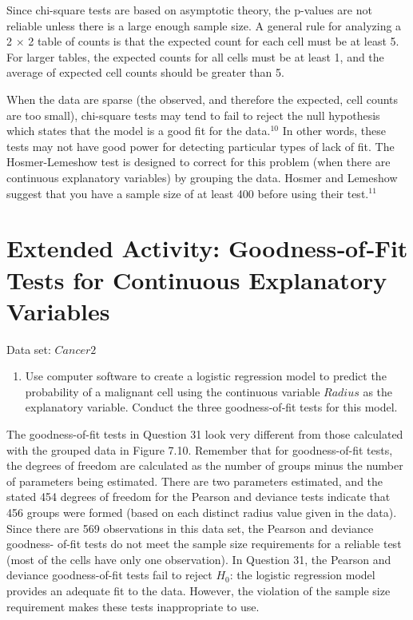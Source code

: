 \documentclass[
]{report}
\providecommand{\tightlist}{%
  \setlength{\itemsep}{0pt}\setlength{\parskip}{0pt}}
\begin{document}
Since chi-square tests are based on asymptotic theory, the p-values are not reliable unless there is a large
enough sample size. A general rule for analyzing a 2 \(\times\) 2 table of counts is that the expected count for each
cell must be at least 5. For larger tables, the expected counts for all cells must be at least 1, and the average
of expected cell counts should be greater than 5.

When the data are sparse (the observed, and therefore the expected, cell counts are too small), chi-square
tests may tend to fail to reject the null hypothesis which states that the model is a good fit for the data.\(^10\) In other
words, these tests may not have good power for detecting particular types of lack of fit. The Hosmer-Lemeshow
test is designed to correct for this problem (when there are continuous explanatory variables) by grouping
the data. Hosmer and Lemeshow suggest that you have a sample size of at least 400 before using their test.\(^11\)

\section*{Extended Activity: Goodness‐of‐Fit Tests for Continuous Explanatory Variables}\label{extended-activity-goodnessoffit-tests-for-continuous-explanatory-variables}

Data set: \(Cancer2\)

\begin{enumerate}
\def\labelenumi{\arabic{enumi}.}
\setcounter{enumi}{30}
\tightlist
\item
  Use computer software to create a logistic regression model to predict the probability of a malignant cell using the continuous variable \(Radius\) as the explanatory variable. Conduct the three goodness‐of‐fit tests for this model.
\end{enumerate}

The goodness-of-fit tests in Question 31 look very different from those calculated with the grouped data
in Figure 7.10. Remember that for goodness-of-fit tests, the degrees of freedom are calculated as the number of
groups minus the number of parameters being estimated. There are two parameters estimated, and the stated 454
degrees of freedom for the Pearson and deviance tests indicate that 456 groups were formed (based on each distinct
radius value given in the data). Since there are 569 observations in this data set, the Pearson and deviance goodness-
of-fit tests do not meet the sample size requirements for a reliable test (most of the cells have only one observation).
In Question 31, the Pearson and deviance goodness-of-fit tests fail to reject \(H_0\): the logistic regression
model provides an adequate fit to the data. However, the violation of the sample size requirement makes these
tests inappropriate to use.
\end{document}
